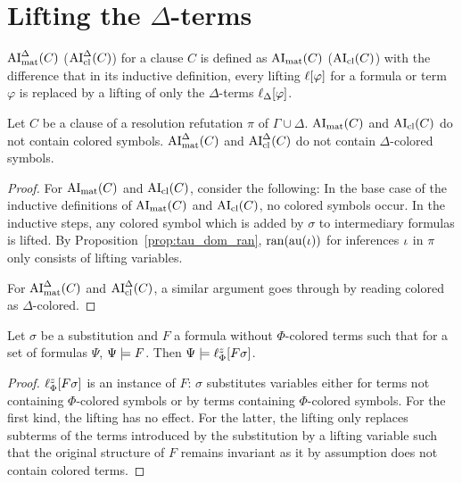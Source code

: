 \documentclass[,%
	draft=false,%
	numbers=noendperiod
	11pt,
	a4paper,
	oneside,%
	openany,
]{memoir}
\begin{document}
\section{Lifting the $\Delta$-terms}

\begin{defi}
	$\operatorname{AI}_\mathrm{mat}^\Delta(C)$ ($\operatorname{AI}_\mathrm{cl}^\Delta(C)$) for a clause $C$ is defined as $\operatorname{AI}_\mathrm{mat}(C)$ ($\operatorname{AI}_\mathrm{cl}(C)$) with the difference that in its inductive definition, every lifting $\ell[\varphi]$ for a formula or term $\varphi$ is replaced by a lifting of only the $\Delta$-terms $\ell_{\Delta}[\varphi]$.
\end{defi}

\begin{lemma}
	\label{lemma:no_colored_terms}
	Let $C$ be a clause of a resolution refutation $\pi$ of $\Gamma\cup\Delta$.
	$\operatorname{AI}_\mathrm{mat}(C)$ and $\operatorname{AI}_\mathrm{cl}(C)$ do not contain colored symbols.
	$\operatorname{AI}_\mathrm{mat}^\Delta(C)$ and $\operatorname{AI}_\mathrm{cl}^\Delta(C)$ do not contain \mbox{$\Delta$-c}olored symbols.
\end{lemma}
\begin{proof}
	For $\operatorname{AI}_\mathrm{mat}(C)$ and $\operatorname{AI}_\mathrm{cl}(C)$, consider the following:
	In the base case of the inductive definitions of $\operatorname{AI}_\mathrm{mat}(C)$ and $\operatorname{AI}_\mathrm{cl}(C)$, no colored symbols occur.
	In the inductive steps, any colored symbol which is added by $\sigma$ to intermediary formulas is lifted.
	By Proposition~\ref{prop:tau_dom_ran}, $\operatorname{ran}(\operatorname{au}(\iota))$ for inferences $\iota$ in $\pi$ only consists of lifting variables.

	For $\operatorname{AI}_\mathrm{mat}^\Delta(C)$ and $\operatorname{AI}_\mathrm{cl}^\Delta(C)$, a similar argument goes through by reading colored as $\Delta$-colored.
\end{proof}

\begin{lemma}
	\label{lemma:substitute_and_lift}
	Let $\sigma$ be a substitution and $F$ a formula without $\Phi$-colored terms such that for a set of formulas $\Psi$, $\Psi \models F$.
	Then $\Psi \models \ell_{\Phi}^{z}[F\sigma]$.
\end{lemma}
\begin{proof}
	$\ell_{\Phi}^{z}[F\sigma]$ is an instance of $F$:
	$\sigma$ substitutes variables either for terms not containing $\Phi$-colored symbols or by terms containing $\Phi$-colored symbols.
	For the first kind, the lifting has no effect.
	For the latter, the lifting only replaces subterms of the terms introduced by the substitution by a lifting variable such that the original structure of $F$ remains invariant as it by assumption does not contain colored terms.
\end{proof}
\end{document}
